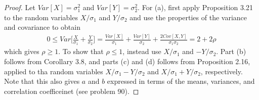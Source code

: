 \begin{proof}
  Let $Var[X] = \sigma_1^2$ and $Var[Y] = \sigma_2^2$. For (a), first apply Proposition 3.21 to the random variables $X/\sigma_1$ and $Y/\sigma_2$ and use the properties of the variance and covariance to obtain
  \begin{align*}
    0 \leq Var\bigg[ \frac{X}{\sigma_1} + \frac{Y}{\sigma_2} \bigg] = \frac{Var[X]}{\sigma_1} + \frac{Var[Y]}{\sigma_2} + \frac{2Cov[X, Y]}{\sigma_1\sigma_2} = 2 + 2\rho
  \end{align*}
  which gives $\rho\geq1$. To show that $\rho\leq1$, instead use $X/\sigma_1$ and $-Y/\sigma_2$. Part (b) follows from Corollary 3.8, and parts (c) and (d) follows from Proposition 2.16, applied to tha random variables $X/\sigma_1 - Y/\sigma_2$ and $X/\sigma_1 + Y/\sigma_2$, respectively. Note that this also gives $a$ and $b$ expressed in terms of the means, variances, and correlation coefficeinet (see problem 90).
\end{proof}

